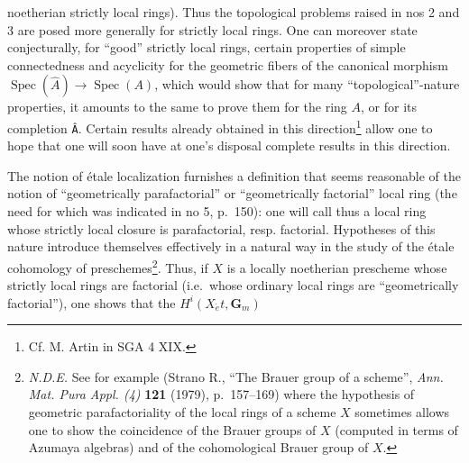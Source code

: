 \documentclass[
  11pt,
  a4paper,
]{book}
\begin{document}
noetherian strictly local rings). Thus the topological problems raised
in nos 2 and 3 are posed more generally for strictly local rings. One
can moreover state conjecturally, for ``good'' strictly local rings,
certain properties of simple connectedness and acyclicity for the
geometric fibers of the canonical morphism
\(\operatorname{Spec}(\hat{A}) \to
\operatorname{Spec}(A)\), which would show that for many
``topological''-nature properties, it amounts to the same to prove them
for the ring \(A\), or for its completion \texttt{Â}. Certain results
already obtained in this direction\footnote{Cf. M. Artin in SGA 4 XIX.}
allow one to hope that one will soon have at one's disposal complete
results in this direction.

The notion of étale localization furnishes a definition that seems
reasonable of the notion of ``geometrically parafactorial'' or
``geometrically factorial'' local ring (the need for which was indicated
in no 5, p.~150): one will call thus a local ring whose strictly local
closure is parafactorial, resp. factorial. Hypotheses of this nature
introduce themselves effectively in a natural way in the study of the
étale cohomology of preschemes\footnote{\emph{N.D.E.} See for example
  (Strano R., ``The Brauer group of a scheme'', \emph{Ann. Mat. Pura
  Appl. (4)} \textbf{121} (1979), p.~157--169) where the hypothesis of
  geometric parafactoriality of the local rings of a scheme \(X\)
  sometimes allows one to show the coincidence of the Brauer groups of
  \(X\) (computed in terms of Azumaya algebras) and of the cohomological
  Brauer group of \(X\).}. Thus, if \(X\) is a locally noetherian
prescheme whose strictly local rings are factorial (i.e.~whose ordinary
local rings are ``geometrically factorial''), one shows that the
\(H^{i}(X_{\acute{e}}t, \mathbf{G}_{m})\)
\end{document}
